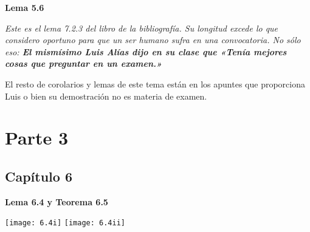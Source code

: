\documentclass[openany]{book}
\begin{document}
\begin{center}
\textbf{Lema 5.6}
\end{center}
\textit{Este es el lema 7.2.3 del libro de la bibliografía. Su longitud excede lo que considero oportuno para que un ser humano sufra en una convocatoria. No sólo eso: \textbf{El mismísimo Luis Alías dijo en su clase que «Tenía mejores cosas que preguntar en un examen.»}}


El resto de corolarios y lemas de este tema están en los apuntes que proporciona Luis o bien su demostración no es materia de examen.


\part{Parte 3}

\chapter{Capítulo 6}

\begin{center}
\textbf{Lema 6.4 y Teorema 6.5}
\end{center}

\texttt{[image: 6.4i]}
\texttt{[image: 6.4ii]}
\end{document}
